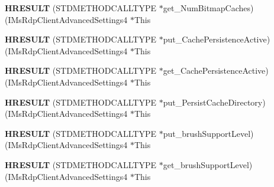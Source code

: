 \begin{DoxyCompactItemize}
\item 
\mbox{\label{struct_i_ms_rdp_client_advanced_settings4_vtbl_a333c7e056276e5323af6e4e3deaced1a}} 
{\bfseries H\+R\+E\+S\+U\+LT} (S\+T\+D\+M\+E\+T\+H\+O\+D\+C\+A\+L\+L\+T\+Y\+PE $\ast$get\+\_\+\+Num\+Bitmap\+Caches)(I\+Ms\+Rdp\+Client\+Advanced\+Settings4 $\ast$This
\item 
\mbox{\label{struct_i_ms_rdp_client_advanced_settings4_vtbl_a337df11c4362613dc371268039892f71}} 
{\bfseries H\+R\+E\+S\+U\+LT} (S\+T\+D\+M\+E\+T\+H\+O\+D\+C\+A\+L\+L\+T\+Y\+PE $\ast$put\+\_\+\+Cache\+Persistence\+Active)(I\+Ms\+Rdp\+Client\+Advanced\+Settings4 $\ast$This
\item 
\mbox{\label{struct_i_ms_rdp_client_advanced_settings4_vtbl_ad709b83484df7f08f5c046dc371aa376}} 
{\bfseries H\+R\+E\+S\+U\+LT} (S\+T\+D\+M\+E\+T\+H\+O\+D\+C\+A\+L\+L\+T\+Y\+PE $\ast$get\+\_\+\+Cache\+Persistence\+Active)(I\+Ms\+Rdp\+Client\+Advanced\+Settings4 $\ast$This
\item 
\mbox{\label{struct_i_ms_rdp_client_advanced_settings4_vtbl_ad25eae0fa974b3efc9f5174043775a79}} 
{\bfseries H\+R\+E\+S\+U\+LT} (S\+T\+D\+M\+E\+T\+H\+O\+D\+C\+A\+L\+L\+T\+Y\+PE $\ast$put\+\_\+\+Persist\+Cache\+Directory)(I\+Ms\+Rdp\+Client\+Advanced\+Settings4 $\ast$This
\item 
\mbox{\label{struct_i_ms_rdp_client_advanced_settings4_vtbl_ab4d1f89d3300b5df303ce4a05923604d}} 
{\bfseries H\+R\+E\+S\+U\+LT} (S\+T\+D\+M\+E\+T\+H\+O\+D\+C\+A\+L\+L\+T\+Y\+PE $\ast$put\+\_\+brush\+Support\+Level)(I\+Ms\+Rdp\+Client\+Advanced\+Settings4 $\ast$This
\item 
\mbox{\label{struct_i_ms_rdp_client_advanced_settings4_vtbl_a9fb7a44eccc282017e6b4f2dd76501dc}} 
{\bfseries H\+R\+E\+S\+U\+LT} (S\+T\+D\+M\+E\+T\+H\+O\+D\+C\+A\+L\+L\+T\+Y\+PE $\ast$get\+\_\+brush\+Support\+Level)(I\+Ms\+Rdp\+Client\+Advanced\+Settings4 $\ast$This
\item 
\mbox{\label{struct_i_ms_rdp_client_advanced_settings4_vtbl_aed1ceefed72c930e932f6bd02fc58d61}} 

\end{DoxyCompactItemize}
